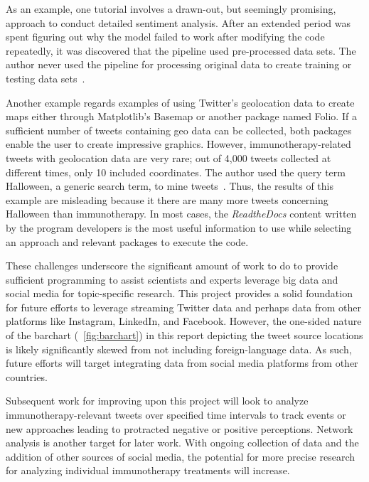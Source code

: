 As an example, one tutorial involves a drawn-out, but seemingly
promising, approach to conduct detailed sentiment analysis.  After an
extended period was spent figuring out why the model failed to work
after modifying the code repeatedly, it was discovered that the
pipeline used pre-processed data sets.  The author never used the
pipeline for processing original data to create training or testing
data sets~\cite{cranfill2017}.

Another example regards examples of using Twitter's geolocation data
to create maps either through Matplotlib's Basemap or another package
named Folio. If a sufficient number of tweets containing geo data can
be collected, both packages enable the user to create impressive
graphics.  However, immunotherapy-related tweets with geolocation data
are very rare; out of 4,000 tweets collected at different times, only
10 included coordinates.  The author used the query term Halloween, a
generic search term, to mine tweets~\cite{ianbroad2014}.  Thus, the
results of this example are misleading because it there are many more
tweets concerning Halloween than immunotherapy.  In most cases, the
\emph{ReadtheDocs} content written by the program developers is the
most useful information to use while selecting an approach and
relevant packages to execute the code.

These challenges underscore the significant amount of work to do to
provide sufficient programming to assist scientists and experts
leverage big data and social media for topic-specific research.  This
project provides a solid foundation for future efforts to leverage
streaming Twitter data and perhaps data from other platforms like
Instagram, LinkedIn, and Facebook.  However, the one-sided nature of
the barchart (~\ref{fig:barchart}) in this report depicting the tweet
source locations is likely significantly skewed from not including
foreign-language data.  As such, future efforts will target
integrating data from social media platforms from other countries.

Subsequent work for improving upon this project will look to analyze
immunotherapy-relevant tweets over specified time intervals to track
events or new approaches leading to protracted negative or positive
perceptions.  Network analysis is another target for later work.  With
ongoing collection of data and the addition of other sources of social
media, the potential for more precise research for analyzing
individual immunotherapy treatments will increase.



 


